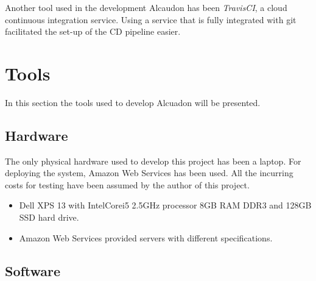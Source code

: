 Another tool used in the development Alcaudon has been \textit{TravisCI}, a
cloud continuous integration service. Using a service that is fully integrated
with git facilitated the set-up of the CD pipeline easier.

\section{Tools}

In this section the tools used to develop Alcuadon will be presented. 

\subsection{Hardware}

The only physical hardware used to develop this project has been a laptop. For
deploying the system, Amazon Web Services has been used. All the incurring costs
for testing have been assumed by the author of this project.

\begin{itemize}
  \item Dell XPS 13 with Intel\textregistered Core\texttrademark i5 2.5GHz
    processor 8GB RAM DDR3 and 128GB SSD hard drive.
  \item Amazon Web Services provided servers with different specifications.
\end{itemize}

\subsection{Software}

